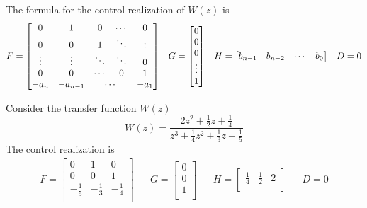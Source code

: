 The formula for the control realization of $W(z)$ is
\begin{align*}
    F = \begin{bmatrix}
        0 & 1 & 0 & \cdots & 0\\
        0& 0 & 1 & \ddots & \vdots \\
        \vdots & \vdots & \ddots & \ddots & 0\\
        0 & 0 & \cdots & 0 & 1\\
        -a_n & -a_{n-1} & \multicolumn{2}{c}{\cdots} & -a_1\\
    \end{bmatrix}
    &&
    G = \begin{bmatrix}
        0\\
        0\\
        0\\
        \vdots\\
        1\\
    \end{bmatrix}
    &&
    H = \begin{bmatrix}
        b_{n-1} & b_{n-2} & \cdots & b_0\\
    \end{bmatrix}
    &&
    D = 0
\end{align*}
\begin{exa}
    Consider the transfer function $W(z)$
    \[ W(z) = \frac{2z^2 + \frac{1}{2}z + \frac{1}{4}}{z^3 + \frac{1}{4}z^2 + \frac{1}{3}z + \frac{1}{5}} \]
    The control realization is
    \begin{align*}
        F = \begin{bmatrix}
            0 & 1 & 0\\
            0 & 0 & 1\\
            -\frac{1}{5} & -\frac{1}{3} & -\frac{1 }{4}\\
        \end{bmatrix}
        &&
        G = \begin{bmatrix}
            0\\
            0\\
            1\\
        \end{bmatrix}
        &&
        H = \begin{bmatrix}
            \frac{1}{4} & \frac{1}{2} & 2\\
        \end{bmatrix}
        &&
        D = 0
    \end{align*}
\end{exa}


